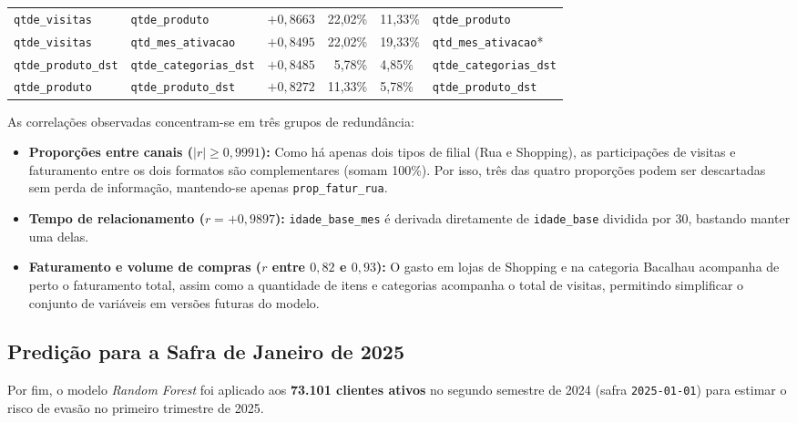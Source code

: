 \begin{table}[H]
{\begin{tabular}{llrrll}
\texttt{qtde\_visitas} & \texttt{qtde\_produto} & $+0,8663$ & 22,02\% & 11,33\% & \texttt{qtde\_produto} \\
\texttt{qtde\_visitas} & \texttt{qtd\_mes\_ativacao} & $+0,8495$ & 22,02\% & 19,33\% & \texttt{qtd\_mes\_ativacao}* \\
\texttt{qtde\_produto\_dst} & \texttt{qtde\_categorias\_dst} & $+0,8485$ & 5,78\% & 4,85\% & \texttt{qtde\_categorias\_dst} \\
\texttt{qtde\_produto} & \texttt{qtde\_produto\_dst} & $+0,8272$ & 11,33\% & 5,78\% & \texttt{qtde\_produto\_dst} \\
\bottomrule
\end{tabular}%
}
\end{table}

As correlações observadas concentram-se em três grupos de redundância:
\begin{itemize}[leftmargin=*]
    \item \textbf{Proporções entre canais ($|r| \ge 0,9991$):} Como há apenas dois tipos de filial (Rua e Shopping), as participações de visitas e faturamento entre os dois formatos são complementares (somam 100\%). Por isso, três das quatro proporções podem ser descartadas sem perda de informação, mantendo-se apenas \texttt{prop\_fatur\_rua}.
    \item \textbf{Tempo de relacionamento ($r = +0,9897$):} \texttt{idade\_base\_mes} é derivada diretamente de \texttt{idade\_base} dividida por 30, bastando manter uma delas.
    \item \textbf{Faturamento e volume de compras ($r$ entre $0,82$ e $0,93$):} O gasto em lojas de Shopping e na categoria Bacalhau acompanha de perto o faturamento total, assim como a quantidade de itens e categorias acompanha o total de visitas, permitindo simplificar o conjunto de variáveis em versões futuras do modelo.
\end{itemize}

\subsection{Predição para a Safra de Janeiro de 2025}\label{subsec:predicao_producao}

Por fim, o modelo \textit{Random Forest} foi aplicado aos \textbf{73.101 clientes ativos} no segundo semestre de 2024 (safra \texttt{2025-01-01}) para estimar o risco de evasão no primeiro trimestre de 2025.

